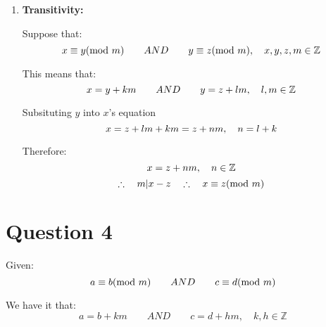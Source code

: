 \documentclass{article}
\numberwithin{equation}{subsection}
\begin{document}
\begin{enumerate}
		\vspace{15pt}
		\item \textbf{Transitivity:}
		
		\vspace{5pt}
		\par{
			Suppose that:
		}
		\begin{equation}\notag
			x\equiv y(\textrm{mod}\ m) \qquad AND \qquad y\equiv z(\textrm{mod}\ m), \quad x,y,z,m \in \mathbb{Z}
		\end{equation}

		This means that:
		\begin{equation}\notag
			x=y+km \qquad AND \qquad y=z+lm, \quad l,m \in \mathbb{Z}
		\end{equation}

		Subsituting $y$ into $x$'s equation
		\begin{equation}\notag
			x = z + lm + km = z+nm, \quad n=l+k	
		\end{equation}

		Therefore:
		\begin{equation}\notag
			x = z+nm, \quad n\in \mathbb{Z}
		\end{equation}
		\begin{equation}\notag
				\therefore \quad m|x-z \quad \therefore \quad x \equiv z(\textrm{mod}\ m)	
		\end{equation}
	\end{enumerate}
	
	\thispagestyle{fancy}

	\newpage
	\section*{Question 4}
	Given:
	\begin{equation}\notag
		a \equiv b(\textrm{mod}\ m) \qquad AND \qquad c \equiv d(\textrm{mod}\ m)
	\end{equation}
	
	We have it that:
	\begin{equation}\tag{1}
		a=b+km \qquad AND \qquad c=d+hm, \quad k,h \in \mathbb{Z}
	\end{equation}
\end{document}
